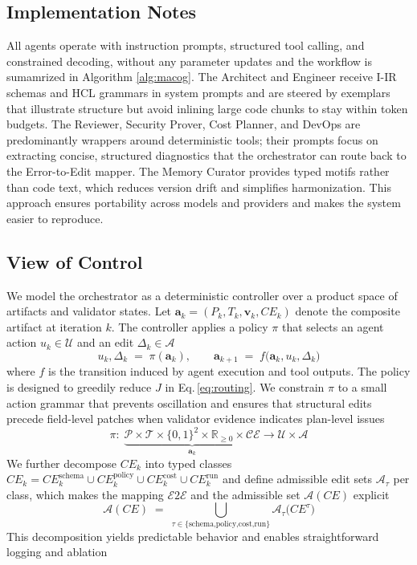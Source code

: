 \documentclass[manuscript,screen,nonacm]{acmart}
\begin{document}
\subsection{Implementation Notes}
\label{sec:nofinetune}

All agents operate with instruction prompts, structured tool calling, and constrained decoding, without any parameter updates and the workflow is sumamrized in Algorithm \ref{alg:macog}. The Architect and Engineer receive I-IR schemas and HCL grammars in system prompts and are steered by exemplars that illustrate structure but avoid inlining large code chunks to stay within token budgets. The Reviewer, Security Prover, Cost Planner, and DevOps are predominantly wrappers around deterministic tools; their prompts focus on extracting concise, structured diagnostics that the orchestrator can route back to the Error-to-Edit mapper. The Memory Curator provides typed motifs rather than code text, which reduces version drift and simplifies harmonization. This approach ensures portability across models and providers and makes the system easier to reproduce.

\subsection{View of Control}
\label{sec:math}

We model the orchestrator as a deterministic controller over a product space of artifacts and validator states. Let $\mathbf{a}_k = (P_k, T_k, \mathbf{v}_k, CE_k)$ denote the composite artifact at iteration $k$. The controller applies a policy $\pi$ that selects an agent action $u_k \in \mathcal{U}$ and an edit $\Delta_k \in \mathcal{A}$
\begin{equation}
u_k, \Delta_k \;=\; \pi(\mathbf{a}_k), \qquad \mathbf{a}_{k+1} \;=\; f\big(\mathbf{a}_k, u_k, \Delta_k\big)
\end{equation}
where $f$ is the transition induced by agent execution and tool outputs. The policy is designed to greedily reduce $J$ in Eq.\,\eqref{eq:routing}. We constrain $\pi$ to a small action grammar that prevents oscillation and ensures that structural edits precede field-level patches when validator evidence indicates plan-level issues
\begin{equation}
\pi:\; \underbrace{\mathcal{P} \times \mathcal{T} \times \{0,1\}^2 \times \mathbb{R}_{\ge 0} \times \mathcal{C\!E}}_{\mathbf{a}_k} \rightarrow \mathcal{U} \times \mathcal{A}
\end{equation}
We further decompose $CE_k$ into typed classes $CE_k = CE_k^{\text{schema}} \cup CE_k^{\text{policy}} \cup CE_k^{\text{cost}} \cup CE_k^{\text{run}}$ and define admissible edit sets $\mathcal{A}_\tau$ per class, which makes the mapping $\mathcal{E2E}$ and the admissible set $\mathcal{A}(CE)$ explicit
\begin{equation}
\mathcal{A}(CE) \;=\; \bigcup_{\tau \in \{\text{schema,policy,cost,run}\}} \mathcal{A}_\tau\big( CE^\tau \big)
\end{equation}
This decomposition yields predictable behavior and enables straightforward logging and ablation
\end{document}

